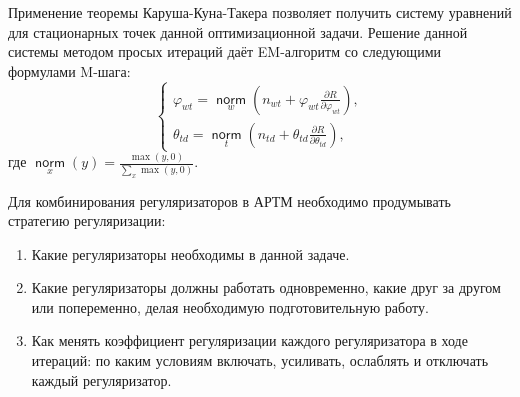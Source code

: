 \documentclass[12pt]{article}
\renewcommand{\phi}{\varphi}
\newcommand{\norm}{\mathop{\mathsf{norm}}\limits}
\begin{document}
Применение теоремы Каруша-Куна-Такера позволяет получить систему уравнений для стационарных точек данной оптимизационной задачи. Решение данной системы методом просых итераций даёт EM-алгоритм со следующими формулами M-шага:
\[
\left\{
	\begin{aligned}
\phi_{wt} = \norm_w  \left(n_{wt} + \phi_{wt}\frac{\partial R}{\partial\phi_{wt}}\right),\\
\theta_{td} = \norm_t  \left(n_{td} + \theta_{td}\frac{\partial R}{\partial\theta_{td}}\right),
	\end{aligned}
\right.
\]
где $\norm_x(y) = \frac{\max(y, 0)}{\sum\limits_x \max(y, 0)}$.

Для комбинирования регуляризаторов в АРТМ необходимо продумывать стратегию регуляризации:
\begin{enumerate}
\item Какие регуляризаторы необходимы в данной задаче.
\item Какие регуляризаторы должны работать одновременно, какие друг за другом или попеременно, делая необходимую подготовительную работу.
\item Как менять коэффициент регуляризации каждого регуляризатора в ходе итераций: по каким условиям включать, усиливать, ослаблять и отключать каждый регуляризатор.
\end{enumerate}
\end{document}
